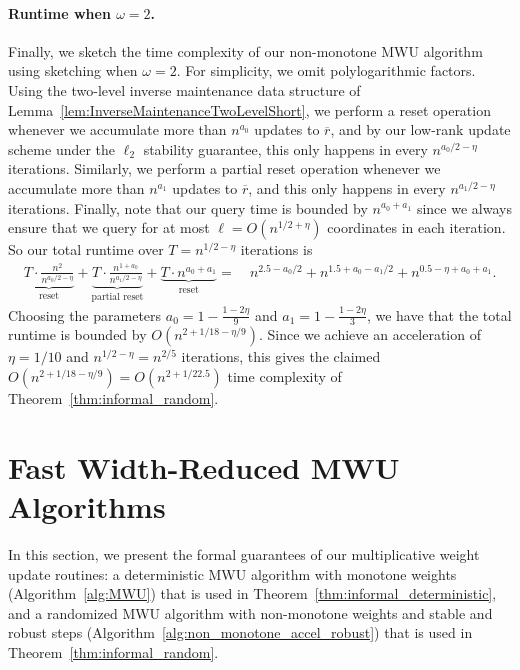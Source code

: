 \documentclass[11pt]{article}
\newcommand\rr{\boldsymbol{\mathit{r}}}
\newcommand{\ov}{\overline}
\begin{document}
\paragraph{Runtime when $\omega = 2$.}
 Finally, we sketch the time complexity of our non-monotone MWU algorithm using sketching when $\omega = 2$.
 For simplicity, we omit polylogarithmic factors. 
 Using the two-level inverse maintenance data structure of Lemma~\ref{lem:InverseMaintenanceTwoLevelShort}, we perform a reset operation whenever we accumulate more than $n^{a_0}$ updates to $\ov{\rr}$, and by our low-rank update scheme under the $\ell_2$ stability guarantee, this only happens in every $n^{a_0/2-\eta}$ iterations. Similarly, we perform a partial reset operation whenever we accumulate more than $n^{a_1}$ updates to $\ov{\rr}$, and this only happens in every $n^{a_1/2-\eta}$ iterations. Finally, note that our query time is bounded by $n^{a_0+a_1}$ since we always ensure that we query for at most $\ell = O(n^{1/2+\eta})$ coordinates in each iteration. So our total runtime over $T = n^{1/2-\eta}$ iterations is
\begin{align*}
\underbrace{T \cdot \frac{n^2}{n^{a_0/2-\eta}}}_{\text{reset}} + \underbrace{T \cdot \frac{n^{1 + a_0}}{n^{a_1/2-\eta}}}_{\text{partial reset}} + \underbrace{T \cdot n^{a_0+a_1}}_{\text{reset}} 
= &~ n^{2.5 - a_0/2} + n^{1.5 + a_0 - a_1/2} + n^{0.5-\eta+a_0+a_1}.
\end{align*}
Choosing the parameters $a_0 = 1 - \frac{1 - 2 \eta}{9}$ and $a_1 = 1 - \frac{1 - 2 \eta}{3}$, we have that the total runtime is bounded by $O(n^{2+1/18-\eta/9})$. Since we achieve an acceleration of $\eta = 1/10$ and $n^{1/2-\eta} = n^{2/5}$ iterations, this gives the claimed $O(n^{2+1/18-\eta/9}) = O(n^{2+1/22.5})$ time complexity of Theorem~\ref{thm:informal_random}.









 \section{Fast Width-Reduced MWU Algorithms}\label{sec:MWUDirect}
In this section, we present the formal guarantees of our multiplicative weight update routines: a deterministic MWU algorithm with monotone weights (Algorithm~\ref{alg:MWU}) that is used in Theorem~\ref{thm:informal_deterministic}, and a randomized MWU algorithm with non-monotone weights and stable and robust steps  (Algorithm~\ref{alg:non_monotone_accel_robust}) that is used in Theorem~\ref{thm:informal_random}.
\end{document}
